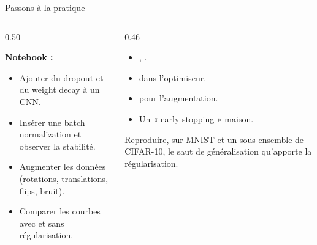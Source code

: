 \begin{frame}{Passons à la pratique}
\begin{columns}[t]
\begin{column}{0.50\textwidth}
\begin{abox}
\textbf{Notebook :} 
\begin{itemize}
  \item Ajouter du dropout et du weight decay à un CNN.
  \item Insérer une batch normalization et observer la stabilité.
  \item Augmenter les données (rotations, translations, flips, bruit).
  \item Comparer les courbes avec et sans régularisation.
\end{itemize}
\end{abox}
\end{column}
\begin{column}{0.46\textwidth}
\begin{kbox}
\begin{itemize}
  \item {}, .
  \item {} dans l'optimiseur.
  \item {} pour l'augmentation.
  \item Un « early stopping » maison.
\end{itemize}
\end{kbox}
\begin{ebox}[Objectif]
Reproduire, sur MNIST et un sous-ensemble de CIFAR-10, le saut de généralisation
qu'apporte la régularisation.
\end{ebox}
\end{column}
\end{columns}
\end{frame}